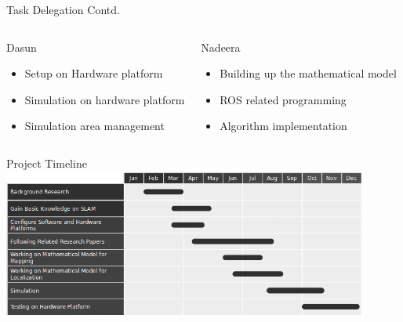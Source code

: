 \documentclass[xcolor=table]{beamer}
\begin{document}
\begin{frame}{Task Delegation Contd.}

  \begin{columns}
  \begin{block}{Dasun} 
  \begin{itemize}
  \item Setup on Hardware platform
  \item Simulation on hardware platform
  \item Simulation area management
  \end{itemize}
  \end{block}
  
  \begin{block}{Nadeera} 
  \begin{itemize}
  \item Building up the mathematical model
  \item ROS related programming
  \item Algorithm implementation
  \end{itemize}
  \end{block}
  \end{columns} 
\end{frame}

\begin{frame}{Project Timeline}
 \includegraphics[width=12cm]{TimeLine.png}
\end{frame}
\end{document}
